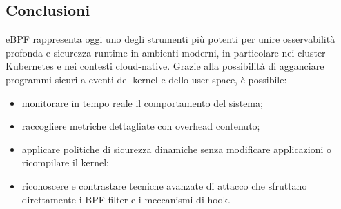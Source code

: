 \subsection{Conclusioni}

eBPF rappresenta oggi uno degli strumenti più potenti per unire osservabilità
profonda e sicurezza runtime in ambienti moderni, in particolare nei cluster
Kubernetes e nei contesti cloud-native. Grazie alla possibilità di agganciare
programmi sicuri a eventi del kernel e dello user space, è possibile:

\begin{itemize}
  \item monitorare in tempo reale il comportamento del sistema;
  \item raccogliere metriche dettagliate con overhead contenuto;
  \item applicare politiche di sicurezza dinamiche senza modificare applicazioni
        o ricompilare il kernel;
  \item riconoscere e contrastare tecniche avanzate di attacco che sfruttano
        direttamente i BPF filter e i meccanismi di hook.
\end{itemize}

